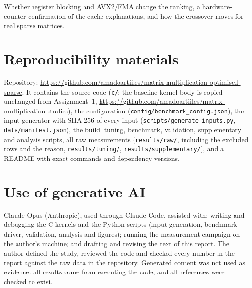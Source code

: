 \documentclass[11pt,a4paper]{article}
\newcommand{\concept}[1]{\par\addvspace{8pt}\Needspace{5\baselineskip}%
  \noindent{\color{accent}\bfseries\boldmath #1}\par\nopagebreak\vspace{2pt}}
\newcommand{\RepoURL}{https://github.com/amadoartiiles/matrix-multiplication-optimised-sparse}
\newcommand{\AOneURL}{https://github.com/amadoartiiles/matrix-multiplication-studies}
\begin{document}
\concept{Open questions}
Whether register blocking and AVX2/FMA change the ranking, a hardware-counter confirmation of the
cache explanations, and how the crossover moves for real sparse matrices.

\section*{Reproducibility materials}
Repository: \url{\RepoURL}. It contains the source code (\texttt{c/}; the baseline kernel body is
copied unchanged from Assignment~1, \url{\AOneURL}), the configuration
(\texttt{config/benchmark\_config.json}), the input generator with SHA-256 of every input
(\texttt{scripts/generate\_inputs.py}, \texttt{data/manifest.json}), the build, tuning, benchmark,
validation, supplementary and analysis scripts, all raw measurements (\texttt{results/raw/},
including the excluded rows and the reason, \texttt{results/tuning/},
\texttt{results/supplementary/}), and a README with exact commands and dependency versions.

\section*{Use of generative AI}
Claude Opus (Anthropic), used through Claude Code, assisted with: writing and debugging the C
kernels and the Python scripts (input generation, benchmark driver, validation, analysis and
figures); running the measurement campaign on the author's machine; and drafting and revising the
text of this report. The author defined the study, reviewed the code and checked every number in
the report against the raw data in the repository. Generated content was not used as evidence:
all results come from executing the code, and all references were checked to exist.
\end{document}
